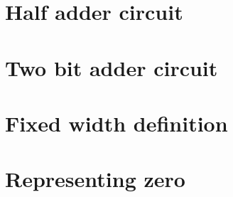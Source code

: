 
\section*{Half adder circuit}

\vfill
\section*{Two bit adder circuit}

\vfill
\section*{Fixed width definition}

\vfill
\section*{Representing zero}

\vfill
